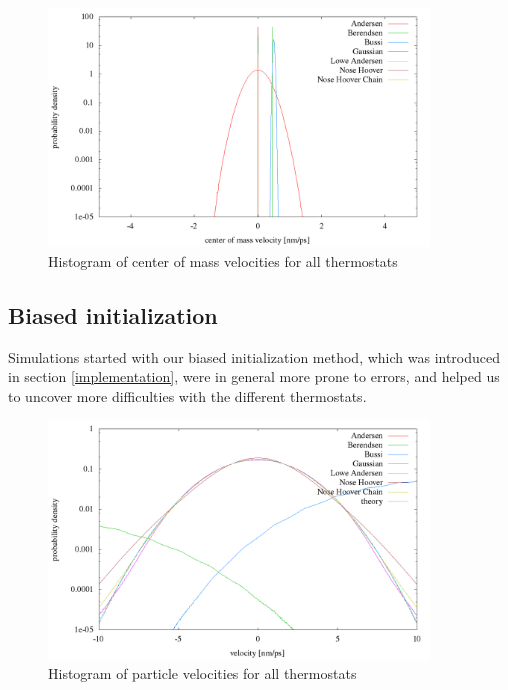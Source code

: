 \begin{figure}[H]
\centering
\includegraphics[width=0.9\textwidth]{./graphics/Histogramm_schwerVel_rand_T=20_p=64.png}
\caption{Histogram of center of mass velocities for all thermostats}
\label{im:schwerVel_rand}
\end{figure} 

\newpage
\subsection{Biased initialization}
Simulations started with our biased initialization method, which was introduced in section \ref{implementation}, were in general more prone to errors, and helped us to uncover more difficulties with the different thermostats. 

\begin{figure}[H]
\centering
  	\includegraphics[width=0.9\textwidth]{./graphics/Histogramm_velocity_one_T=20_p=64.png}
  	\caption{Histogram of particle velocities for all thermostats}
    \label{im:vel_one}
\end{figure} 


